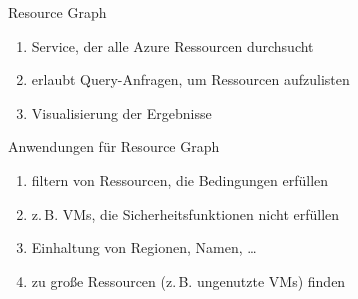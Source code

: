 
\begin{flashcard}[Definition]{Resource Graph}
  \begin{enumerate}
    \item Service, der alle Azure Ressourcen durchsucht
    \item erlaubt Query-Anfragen, um Ressourcen aufzulisten
    \item Visualisierung der Ergebnisse
  \end{enumerate}
\end{flashcard}

\begin{flashcard}[Definition]{Anwendungen für Resource Graph}
  \begin{enumerate}
    \item filtern von Ressourcen, die Bedingungen erfüllen
    \item z.\,B. VMs, die Sicherheitsfunktionen nicht erfüllen
    \item Einhaltung von Regionen, Namen, \ldots
    \item zu große Ressourcen (z.\,B. ungenutzte VMs) finden
  \end{enumerate}
\end{flashcard}
